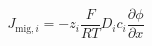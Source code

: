 \documentclass[preview]{standalone}
\begin{document}
\[J_{\text{mig},i} = -z_i \frac{F}{RT} D_i c_i \frac{\partial \phi}{\partial x} \tag{2.7}\]
\end{document}
